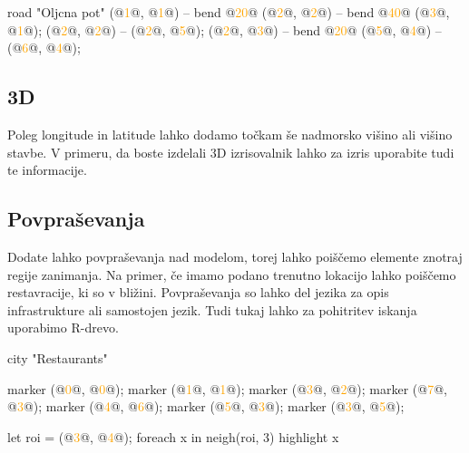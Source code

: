 \documentclass{article}
\newcommand\Num[1]{\textcolor{orange}{#1}}
\begin{document}
\begin{CITY}
  road "Oljcna pot" {
    (@\Num{1}@, @\Num{1}@) -- bend @\Num{20}@ (@\Num{2}@, @\Num{2}@) -- bend @\Num{40}@ (@\Num{3}@, @\Num{1}@);
    (@\Num{2}@, @\Num{2}@) -- (@\Num{2}@, @\Num{5}@);
    (@\Num{2}@, @\Num{3}@) -- bend @\Num{20}@ (@\Num{5}@, @\Num{4}@) -- (@\Num{6}@, @\Num{4}@);
  }
\end{CITY}

\subsection{3D}
Poleg longitude in latitude lahko dodamo točkam še nadmorsko višino ali višino stavbe.
V primeru, da boste izdelali 3D izrisovalnik lahko za izris uporabite tudi te informacije.

\subsection{Povpraševanja}
Dodate lahko povpraševanja nad modelom, torej lahko poiščemo elemente znotraj regije zanimanja.
Na primer, če imamo podano trenutno lokacijo lahko poiščemo restavracije, ki so v bližini.
Povpraševanja so lahko del jezika za opis infrastrukture ali samostojen jezik.
Tudi tukaj lahko za pohitritev iskanja uporabimo R-drevo.

\begin{multicols}{2}
\begin{CITY}
  city "Restaurants" {
    marker (@\Num{0}@, @\Num{0}@);
    marker (@\Num{1}@, @\Num{1}@);
    marker (@\Num{3}@, @\Num{2}@);
    marker (@\Num{7}@, @\Num{3}@);
    marker (@\Num{4}@, @\Num{6}@);
    marker (@\Num{5}@, @\Num{3}@);
    marker (@\Num{3}@, @\Num{5}@);

    let roi = (@\Num{3}@, @\Num{4}@);
    foreach x in neigh(roi, 3) {
      highlight x
    }
  }
\end{CITY}

\columnbreak

\end{multicols}
\end{document}
